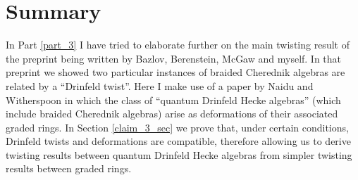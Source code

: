 \section{Summary}
In Part \ref{part_3} I have tried to elaborate further on the main twisting result of the preprint \cite{twistsrcas} being written by Bazlov, Berenstein, McGaw and myself. In that preprint we showed two particular instances of braided Cherednik algebras are related by a ``Drinfeld twist''. Here I make use of a paper by Naidu and Witherspoon \cite{2011arXiv11115243N} in which the class of ``quantum Drinfeld Hecke algebras'' (which include braided Cherednik algebras) arise as deformations of their associated graded rings. In Section \ref{claim_3_sec} we prove that, under certain conditions, Drinfeld twists and deformations are compatible, therefore allowing us to derive twisting results between quantum Drinfeld Hecke algebras from simpler twisting results between graded rings.
